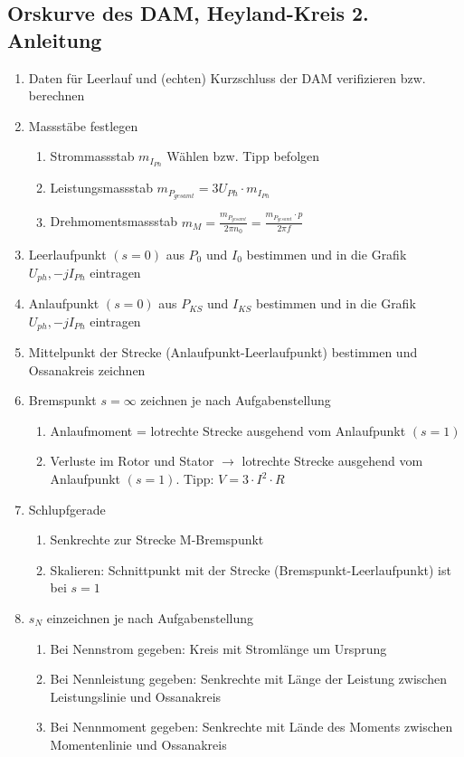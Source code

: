         \newpage
    \subsection{Orskurve des DAM, Heyland-Kreis 2. Anleitung}
    \begin{enumerate}
      \item Daten für Leerlauf und (echten) Kurzschluss der DAM verifizieren
      bzw. berechnen
      \item Massstäbe festlegen
      \begin{enumerate}
        \item Strommassstab $m_{I_{Ph}}$ Wählen bzw. Tipp befolgen
        \item Leistungsmassstab $m_{P_{gesamt}}=3U_{Ph}\cdot m_{I_{Ph}}$
        \item Drehmomentsmassstab $m_M=\frac{m_{P_{gesamt}}}{2\pi n_0} =
        \frac{m_{P_{gesamt}}\cdot p}{2\pi f}$
      \end{enumerate}
      \item Leerlaufpunkt $(s=0)$ aus $P_0$ und $I_0$ bestimmen und in die
      Grafik $U_{ph},-jI_{Ph}$ eintragen
      \item Anlaufpunkt $(s=0)$ aus $P_{KS}$ und $I_{KS}$ bestimmen und in die
      Grafik $U_{ph},-jI_{Ph}$ eintragen
      \item Mittelpunkt der Strecke (Anlaufpunkt-Leerlaufpunkt) bestimmen und
      Ossanakreis zeichnen
      \item Bremspunkt $s=\infty$ zeichnen je nach Aufgabenstellung
      \begin{enumerate}
        \item Anlaufmoment = lotrechte Strecke ausgehend vom Anlaufpunkt $(s=1)$
        \item Verluste im Rotor und Stator $\rightarrow$ lotrechte Strecke
        ausgehend vom Anlaufpunkt $(s=1)$. Tipp: $V=3\cdot I^2\cdot R$
      \end{enumerate}
      \item Schlupfgerade
      \begin{enumerate}
        \item Senkrechte zur Strecke M-Bremspunkt
        \item Skalieren: Schnittpunkt mit der Strecke
        (Bremspunkt-Leerlaufpunkt) ist bei $s=1$
      \end{enumerate}
      \item $s_N$ einzeichnen je nach Aufgabenstellung
      \begin{enumerate}
        \item Bei Nennstrom gegeben: Kreis mit Stromlänge um Ursprung
        \item Bei Nennleistung gegeben: Senkrechte mit Länge der Leistung
        zwischen Leistungslinie und Ossanakreis
        \item Bei Nennmoment gegeben: Senkrechte mit Lände des Moments zwischen
        Momentenlinie und Ossanakreis
      \end{enumerate}
    \end{enumerate}   

